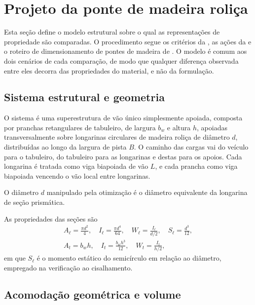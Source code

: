 \section{Projeto da ponte de madeira roliça}\label{sec:bridge_design}

Esta seção define o modelo estrutural sobre o qual as representações de propriedade são comparadas. O procedimento segue os critérios da \textcite{NBR7190-1:2022}, as ações da \textcite{nbr7188} e o roteiro de dimensionamento de pontes de madeira de \textcite{CALIL2006}. O modelo é comum aos dois cenários de cada comparação, de modo que qualquer diferença observada entre eles decorra das propriedades do material, e não da formulação.

\subsection{Sistema estrutural e geometria}\label{sec:sistema}

O sistema é uma superestrutura de vão único simplesmente apoiada, composta por pranchas retangulares de tabuleiro, de largura $b_w$ e altura $h$, apoiadas transversalmente sobre longarinas circulares de madeira roliça de diâmetro $d$, distribuídas ao longo da largura de pista $B$. O caminho das cargas vai do veículo para o tabuleiro, do tabuleiro para as longarinas e destas para os apoios. Cada longarina é tratada como viga biapoiada de vão $L$, e cada prancha como viga biapoiada vencendo o vão local entre longarinas.

O diâmetro $d$ manipulado pela otimização é o diâmetro equivalente da longarina de seção prismática.

As propriedades das seções são
\begin{equation}
\begin{gathered}
A_\ell=\frac{\pi d^2}{4},\quad
I_\ell=\frac{\pi d^4}{64},\quad
W_\ell=\frac{I_\ell}{d/2},\quad
S_\ell=\frac{d^3}{12},\\[4pt]
A_t=b_wh,\quad
I_t=\frac{b_wh^3}{12},\quad
W_t=\frac{I_t}{h/2},
\end{gathered}
\label{eq:secoes}
\end{equation}
em que $S_\ell$ é o momento estático do semicírculo em relação ao diâmetro, empregado na verificação ao cisalhamento.

\subsection{Acomodação geométrica e volume}\label{sec:acomodacao}

